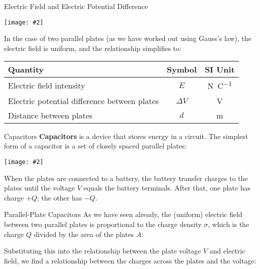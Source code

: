 \documentclass[12pt,aspectratio=169]{beamer}
\newcommand{\pic}[2]{\texttt{[image: \#2]}}
\newcommand{\eq}[2]{\vspace{#1}{\Large\begin{displaymath}#2\end{displaymath}}}
\begin{document}
\begin{frame}{Electric Field and Electric Potential Difference}
  \begin{center}
    \pic{.5}{elfield-600x205.png}
  \end{center}
  \vspace{-.15in}In the case of two parallel plates (as we have worked out using
  Gauss's law), the electric field is uniform, and the relationship simplifies
  to:

  \eq{-.2in}{
    \boxed{E=\frac{\Delta V}{d}}
    \quad\text{or}\quad
    \boxed{\Delta V=Ed}
  }
  \begin{center}
    \begin{tabular}{l|c|c}
      \rowcolor{pink}
      \textbf{Quantity} & \textbf{Symbol} & \textbf{SI Unit} \\ \hline
      Electric field intensity & $E$ & \si{\newton\per\coulomb}\\
      Electric potential difference between plates & $\Delta V$ &
      \si{\volt} \\
      Distance between plates       & $d$ & \si{\metre}
    \end{tabular}
  \end{center}
\end{frame}



\begin{frame}{Capacitors}
  \textbf{Capacitors} is a device that stores energy in a circuit. The simplest
  form of a capacitor is a set of closely spaced parallel plates:
  \begin{center}
    \pic{.5}{cap19.png}
  \end{center}
  When the plates are connected to a battery, the battery transfer charges to
  the plates until the voltage $V$ equals the battery terminals. After that,
  one plate has charge $+Q$; the other has $-Q$.
\end{frame}



\begin{frame}{Parallel-Plate Capacitors}
  As we have seen already, the (uniform) electric field between two parallel
  plates is proportional to the charge density $\sigma$, which is the charge
  $Q$ divided by the area of the plates $A$:

  \eq{-.2in}{
    E=\frac{\textcolor{red}{\sigma}}{\epsilon_0}=
    \frac{\textcolor{red}{Q}}{\textcolor{red}{A}\epsilon_0}
  }
  
  Substituting this into the relationship between the plate voltage $V$ and
  electric field, we find a relationship between the charges across the plates
  and the voltage:

  \eq{-.2in}{
    V=\textcolor{blue}{E}d=
    \frac{\textcolor{blue}{Q}d}{\textcolor{blue}{A\epsilon_0}}
    \quad\longrightarrow\quad
    \boxed{Q=\left[\frac{A\epsilon_0}{d}\right]V}
  }
\end{frame}
\end{document}
